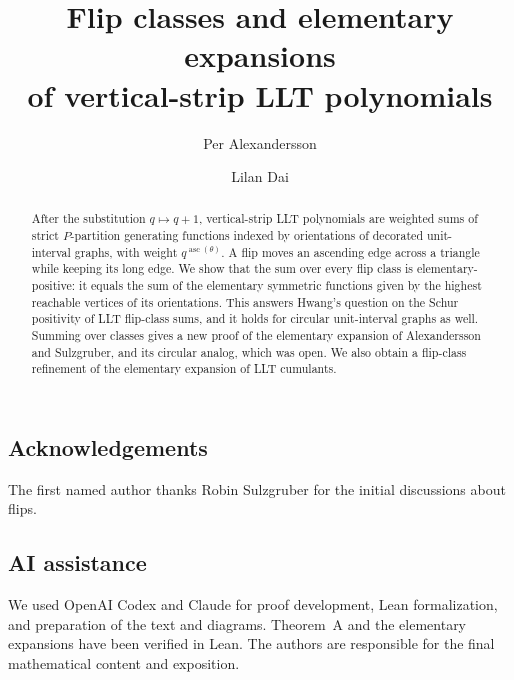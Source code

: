 \documentclass[reqno]{amsart}
\title[Flip classes of vertical-strip LLT polynomials]{%
Flip classes and elementary expansions\\
of vertical-strip LLT polynomials}
\author{Per Alexandersson}
\author{Lilan Dai}
\theoremstyle{definition}
\DeclareMathOperator{\asc}{asc}
\begin{document}
\begin{abstract}
After the substitution $q\mapsto q+1$, vertical-strip LLT polynomials are
weighted sums of strict $P$-partition generating functions indexed by
orientations of decorated unit-interval graphs, with weight
$q^{\asc(\theta)}$.
A flip moves an ascending edge across a triangle while keeping its long edge.
We show that the sum over every flip class is elementary-positive: it equals the
sum of the elementary symmetric functions given by the highest reachable
vertices of its orientations.
This answers Hwang's question on the Schur positivity of LLT flip-class sums,
and it holds for circular unit-interval graphs as well.
Summing over classes gives a new proof of the elementary expansion of
Alexandersson and Sulzgruber, and its circular analog, which was open.
We also obtain a flip-class refinement of the elementary expansion of
LLT cumulants.
\end{abstract}

\maketitle

\setcounter{tocdepth}{1}
\tableofcontents









\subsection*{Acknowledgements}
The first named author thanks Robin Sulzgruber for the initial discussions about
flips.

\subsection*{AI assistance}
We used OpenAI Codex and Claude for proof development, Lean formalization, and
preparation of the text and diagrams.
Theorem~A and the elementary expansions have been verified in Lean.
The authors are responsible for the final mathematical content and exposition.



\end{document}
